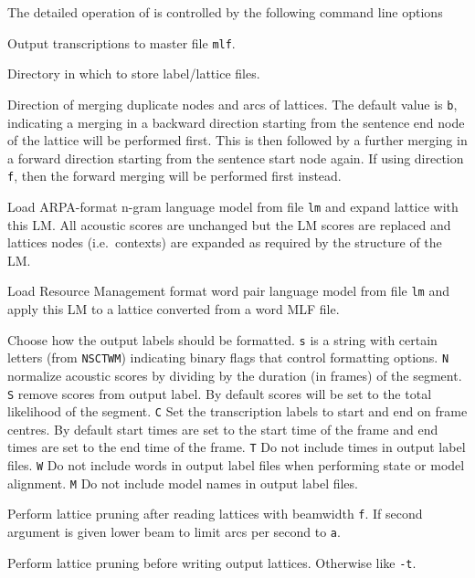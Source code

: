 The detailed operation of  is controlled by the following
command line options
\begin{optlist}

   Output transcriptions to master file \texttt{mlf}.

   Directory in which to store label/lattice files.

   Direction of merging duplicate nodes and arcs of
  lattices. The default value is \texttt{b}, indicating a merging in
  a backward direction starting from the sentence end node of the
  lattice will be performed first. This is then followed by a further merging
  in a forward direction starting from the sentence start node again.
  If using direction \texttt{f}, then the forward merging will be
  performed first instead. 

   Load ARPA-format n-gram language model from file
  \texttt{lm} and expand lattice with this LM. All acoustic scores are
  unchanged but the LM scores are replaced and lattices nodes (i.e.\
  contexts) are expanded as required by the structure of the LM.

   Load Resource Management format word pair language
  model from file \texttt{lm} and apply this LM to a lattice converted
  from a word MLF file. 

   Choose how the output labels should be formatted.
        \texttt{s} is a string with certain letters (from \texttt{NSCTWM})
        indicating binary flags that control formatting options.
        \texttt{N} normalize acoustic scores by dividing by the duration
        (in frames) of the segment.
        \texttt{S} remove scores from output label.  By default 
        scores will be set to the total likelihood of the segment.
        \texttt{C} Set the transcription labels to start and end on
        frame centres. By default start times are set to the start
        time of the frame and end times are set to the end time of 
        the frame.
        \texttt{T} Do not include times in output label files.
        \texttt{W} Do not include words in output label files
        when performing state or model alignment.
        \texttt{M} Do not include model names in output label
        files.

   Perform lattice pruning after reading lattices with
  beamwidth \texttt{f}. If second argument is given lower beam to
  limit arcs per second to \texttt{a}.

   Perform lattice pruning before writing output
  lattices. Otherwise like \texttt{-t}.


\end{optlist}
